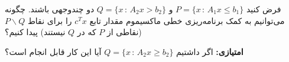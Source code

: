 فرض کنید
$P = \{x\,:\,A_1 x \leq b_1\}$
و
$Q = \{x\,:\,A_2 x > b_2\}$
دو چندوجهی باشند. چگونه می‌توانیم به کمک برنامه‌ریزی خطی ماکسیموم مقدار تابع
$c^T x$
را برای نقاط
$P \backslash  Q$
(نقاطی از 
$P$
که در 
$Q$
نیستند) پیدا کنیم؟
\vspace*{5pt}

\textbf{امتیازی:}
اگر داشتیم
$Q = \{x\,:\,A_2 x \geq b_2\}$
آیا این کار قابل انجام است؟